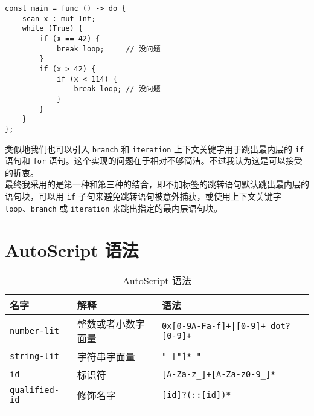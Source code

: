 \begin{lstlisting}
const main = func () -> do {
	scan x : mut Int;
	while (True) {
		if (x == 42) {
			break loop;		// 没问题
		}
		if (x > 42) {
			if (x < 114) {
				break loop;	// 没问题
			}
		}
	}
};
\end{lstlisting}

类似地我们也可以引入 \lstinline!branch! 和 \lstinline!iteration! 上下文关键字用于跳出最内层的 \lstinline!if! 语句和 \lstinline!for! 语句。这个实现的问题在于相对不够简洁。不过我认为这是可以接受的折衷。 \\

最终我采用的是第一种和第三种的结合，即不加标签的跳转语句默认跳出最内层的语句块，可以用 \lstinline!if! 子句来避免跳转语句被意外捕获，或使用上下文关键字 \lstinline!loop!、\lstinline!branch! 或 \lstinline!iteration! 来跳出指定的最内层语句块。


\chapter{AutoScript 语法}

\begin{longtable}{l|p{5cm}|p{6cm}} \hline
	名字 & 解释 & 语法  \\\hline
	\texttt{number-lit} & 整数或者小数字面量 & \texttt{0x[0-9A-Fa-f]+|[0-9]+ dot? [0-9]+} \\\hline
	\texttt{string-lit} & 字符串字面量 & \texttt{" [\^"]* "} \\\hline
	\texttt{id} & 标识符 & \texttt{[A-Za-z\_]+[A-Za-z0-9\_]*} \\\hline
	\texttt{qualified-id} & 修饰名字 & \texttt{[id]?(::[id])*} \\\hline
	\caption{AutoScript 语法}
	\label{tab:grammar}
\end{longtable}